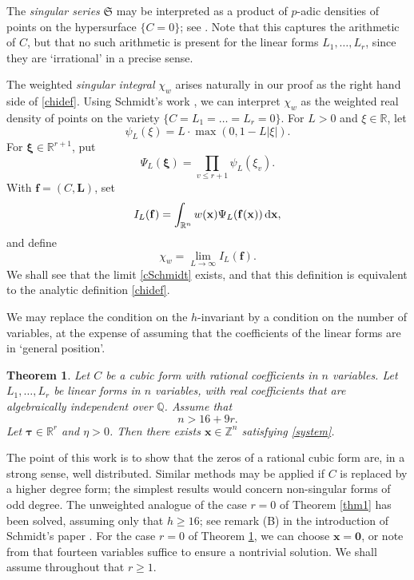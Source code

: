 \documentclass[12pt,reqno]{amsart}
\newtheorem{thm}{Theorem}[section]
\theoremstyle{definition}
\theoremstyle{remark}
\numberwithin{equation}{section}
\begin{document}
The \emph{singular series} ${\mathfrak S}$ may be interpreted as a product of $p$-adic densities of points on the hypersurface $\{ C=0 \}$; see \cite[\S 7]{Bir1962}. Note that this captures the arithmetic of $C$, but that no such arithmetic is present for the linear forms $L_1, \ldots, L_r$, since they are `irrational' in a precise sense. 

The weighted \emph{singular integral} $\chi_w$ arises naturally in our proof as the right hand side of \eqref{chidef}. Using Schmidt's work \cite{Sch1982b, Sch1985}, we can interpret $\chi_w$ as the weighted real density of points on the variety $\{ C = L_1 = \ldots = L_r = 0 \}$. For $L > 0$ and $\xi \in {\mathbb R}$, let
\[
\psi_L(\xi) = L \cdot \max(0,1 - L|\xi|).
\]
For ${{\boldsymbol{\xi}}} \in {\mathbb R}^{r+1}$, put
\[
\Psi_L({{\boldsymbol{\xi}}}) = \prod_{v {\leqslant} r+1} \psi_L(\xi_v).
\]
With ${\mathbf f} = (C,{\mathbf L})$, set
\[
I_L({\mathbf f}) = \int_{{\mathbb R}^n} w({\mathbf x}) \Psi_L({\mathbf f}({\mathbf x})) {{\,{\rm d}}} {\mathbf x},
\]
and define
\begin{equation} \label{cSchmidt}
\chi_w = \lim_{L \to \infty} I_L({\mathbf f}).
\end{equation}
We shall see that the limit \eqref{cSchmidt} exists, and that this definition is equivalent to the analytic definition \eqref{chidef}.

We may replace the condition on the $h$-invariant by a condition on the number of variables, at the expense of assuming that the coefficients of the linear forms are in `general position'.

\begin{thm} \label{thm2} Let $C$ be a cubic form with rational coefficients in $n$ variables. Let $L_1, \ldots, L_r$ be linear forms in $n$ variables, with real coefficients that are algebraically independent over ${\mathbb Q}$. Assume that
\[
n > 16 + 9 r.
\]
Let ${\boldsymbol{\tau}} \in {\mathbb R}^r$ and $\eta > 0$. Then there exists ${\mathbf x} \in {\mathbb Z}^n$ satisfying \eqref{system}.
\end{thm}

The point of this work is to show that the zeros of a rational cubic form are, in a strong sense, well distributed. Similar methods may be applied if $C$ is replaced by a higher degree form; the simplest results would concern non-singular forms of odd degree. The unweighted analogue of the case $r = 0$ of Theorem \ref{thm1} has been solved, assuming only that \mbox{$h {\geqslant} 16$}; see remark (B) in the introduction of Schmidt's paper \cite{Sch1985}. For the case \mbox{$r = 0$} of Theorem \ref{thm2}, we can choose ${\mathbf x} = {\mathbf 0}$, or note from \cite{HB2007} that fourteen variables suffice to ensure a nontrivial solution. We shall assume throughout that $r {\geqslant} 1$.
\end{document}
